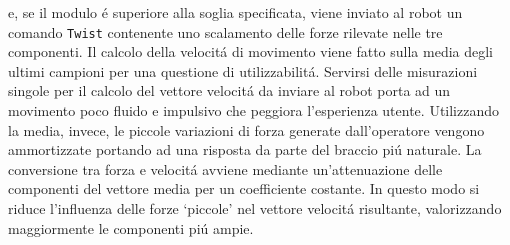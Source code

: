 e, se il modulo \'{e} superiore alla soglia specificata, viene inviato al robot un comando \verb|Twist| contenente uno scalamento delle 
forze rilevate nelle tre componenti. Il calcolo della velocit\'{a} di movimento viene fatto sulla media degli ultimi campioni 
per una questione di utilizzabilit\'{a}. Servirsi delle misurazioni singole per il calcolo del vettore velocit\'{a} da inviare al robot 
porta ad un movimento poco fluido e impulsivo che peggiora l'esperienza utente. 
Utilizzando la media, invece, le piccole variazioni 
di forza generate dall'operatore vengono ammortizzate portando ad una risposta da parte del braccio pi\'{u} naturale.
La conversione tra forza e velocit\'{a} avviene mediante un'attenuazione delle componenti del vettore media per un coefficiente 
costante. In questo modo si riduce l'influenza delle forze `piccole' nel vettore velocit\'{a} risultante, valorizzando maggiormente le 
componenti pi\'{u} ampie. 